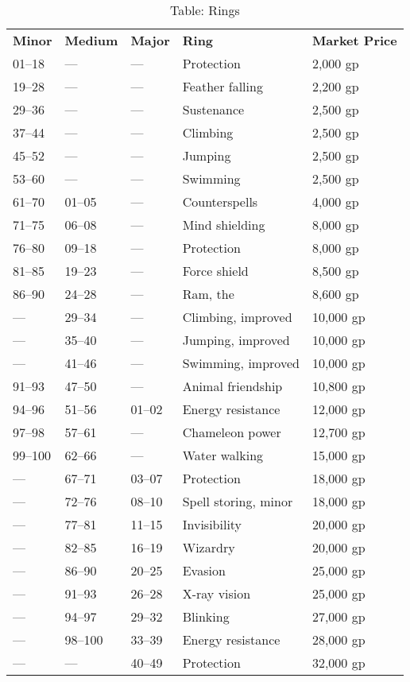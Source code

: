 \begin{table}[]
\sffamily
\caption{Table: Rings}
\begin{tabular}{lllll}
\textbf{Minor} & \textbf{Medium} & \textbf{Major} & \textbf{Ring} & \textbf{Market Price}\\
01–18 & — & — & Protection & 2,000 gp \\
 19–28 & — & — & Feather falling & 2,200 gp \\
 29–36 & — & — & Sustenance & 2,500 gp \\
 37–44 & — & — & Climbing & 2,500 gp \\
 45–52 & — & — & Jumping & 2,500 gp \\
 53–60 & — & — & Swimming & 2,500 gp \\
 61–70 & 01–05 & — & Counterspells & 4,000 gp \\
 71–75 & 06–08 & — & Mind shielding & 8,000 gp \\
 76–80 & 09–18 & — & Protection & 8,000 gp \\
 81–85 & 19–23 & — & Force shield & 8,500 gp \\
 86–90 & 24–28 & — & Ram, the & 8,600 gp \\
 — & 29–34 & — & Climbing, improved & 10,000 gp \\
 — & 35–40 & — & Jumping, improved & 10,000 gp \\
 — & 41–46 & — & Swimming, improved & 10,000 gp \\
 91–93 & 47–50 & — & Animal friendship & 10,800 gp \\
 94–96 & 51–56 & 01–02 & Energy resistance & 12,000 gp \\
 97–98 & 57–61 & — & Chameleon power & 12,700 gp \\
 99–100 & 62–66 & — & Water walking & 15,000 gp \\
 — & 67–71 & 03–07 & Protection & 18,000 gp \\
 — & 72–76 & 08–10 & Spell storing, minor & 18,000 gp \\
 — & 77–81 & 11–15 & Invisibility & 20,000 gp \\
 — & 82–85 & 16–19 & Wizardry & 20,000 gp \\
 — & 86–90 & 20–25 & Evasion & 25,000 gp \\
 — & 91–93 & 26–28 & X-ray vision & 25,000 gp \\
 — & 94–97 & 29–32 & Blinking & 27,000 gp \\
 — & 98–100 & 33–39 & Energy resistance & 28,000 gp \\
 — & — & 40–49 & Protection & 32,000 gp \\

\end{tabular}
\end{table}
